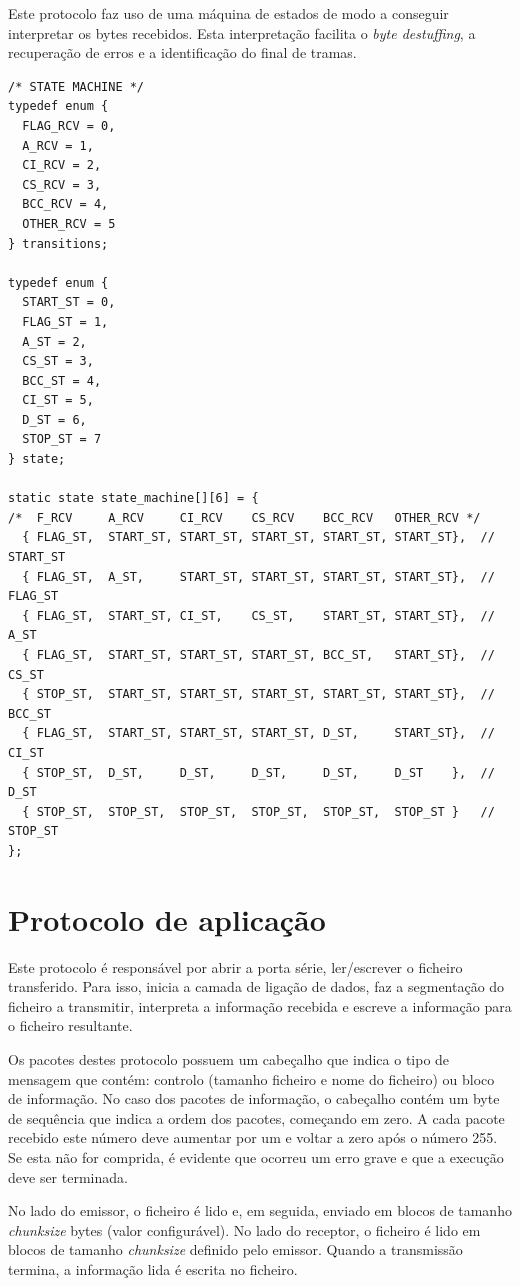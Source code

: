 \documentclass[11pt]{report}
\begin{document}
Este protocolo faz uso de uma máquina de estados de modo a conseguir interpretar
os bytes recebidos. Esta interpretação facilita o \textit{byte destuffing}, a
recuperação de erros e a identificação do final de tramas.
\begin{lstlisting}
/* STATE MACHINE */
typedef enum {
  FLAG_RCV = 0,
  A_RCV = 1,
  CI_RCV = 2,
  CS_RCV = 3,
  BCC_RCV = 4,
  OTHER_RCV = 5
} transitions;

typedef enum {
  START_ST = 0,
  FLAG_ST = 1,
  A_ST = 2,
  CS_ST = 3,
  BCC_ST = 4,
  CI_ST = 5,
  D_ST = 6,
  STOP_ST = 7
} state;

static state state_machine[][6] = {
/*  F_RCV     A_RCV     CI_RCV    CS_RCV    BCC_RCV   OTHER_RCV */
  { FLAG_ST,  START_ST, START_ST, START_ST, START_ST, START_ST},  // START_ST
  { FLAG_ST,  A_ST,     START_ST, START_ST, START_ST, START_ST},  // FLAG_ST
  { FLAG_ST,  START_ST, CI_ST,    CS_ST,    START_ST, START_ST},  // A_ST
  { FLAG_ST,  START_ST, START_ST, START_ST, BCC_ST,   START_ST},  // CS_ST
  { STOP_ST,  START_ST, START_ST, START_ST, START_ST, START_ST},  // BCC_ST
  { FLAG_ST,  START_ST, START_ST, START_ST, D_ST,     START_ST},  // CI_ST
  { STOP_ST,  D_ST,     D_ST,     D_ST,     D_ST,     D_ST    },  // D_ST
  { STOP_ST,  STOP_ST,  STOP_ST,  STOP_ST,  STOP_ST,  STOP_ST }   // STOP_ST
};
\end{lstlisting}

\section{Protocolo de aplicação}

Este protocolo é responsável por abrir a porta série, ler/escrever o ficheiro
transferido. Para isso, inicia a camada de ligação de dados, faz a segmentação
do ficheiro a transmitir, interpreta a informação recebida e escreve a
informação para o ficheiro resultante.

Os pacotes destes protocolo possuem um cabeçalho que indica o tipo de mensagem
que contém: controlo (tamanho ficheiro e nome do ficheiro) ou bloco de
informação. No caso dos pacotes de informação, o cabeçalho contém um byte
de sequência que indica a ordem dos pacotes, começando em zero. A cada pacote
recebido este número deve aumentar por um e voltar a zero após o número 255.
Se esta não for comprida, é evidente que ocorreu um erro grave e que a execução
deve ser terminada.

No lado do emissor, o ficheiro é lido e, em seguida, enviado em blocos de
tamanho \textit{chunksize} bytes (valor configurável). No lado do receptor, o
ficheiro é lido em blocos de tamanho \textit{chunksize} definido pelo emissor.
Quando a transmissão termina, a informação lida é escrita no ficheiro.
\end{document}
